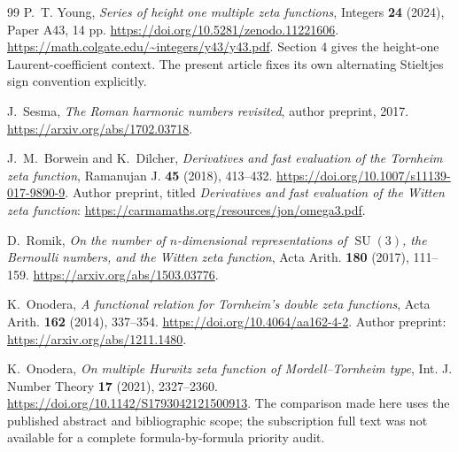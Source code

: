 \begin{thebibliography}{99}
P.~T. Young,
\emph{Series of height one multiple zeta functions},
Integers \textbf{24} (2024), Paper A43, 14 pp.
\url{https://doi.org/10.5281/zenodo.11221606}.
\url{https://math.colgate.edu/~integers/y43/y43.pdf}.
Section 4 gives the height-one Laurent-coefficient context. The present
article fixes its own alternating Stieltjes sign convention explicitly.

J.~Sesma,
\emph{The Roman harmonic numbers revisited}, author preprint, 2017.
\url{https://arxiv.org/abs/1702.03718}.

J.~M.~Borwein and K.~Dilcher,
\emph{Derivatives and fast evaluation of the Tornheim zeta function},
Ramanujan J. \textbf{45} (2018), 413--432.
\url{https://doi.org/10.1007/s11139-017-9890-9}.
Author preprint, titled \emph{Derivatives and fast evaluation of the
Witten zeta function}:
\url{https://carmamaths.org/resources/jon/omega3.pdf}.

D.~Romik,
\emph{On the number of $n$-dimensional representations of
$\operatorname{SU}(3)$, the Bernoulli numbers, and the Witten zeta
function}, Acta Arith. \textbf{180} (2017), 111--159.
\url{https://arxiv.org/abs/1503.03776}.

K.~Onodera,
\emph{A functional relation for Tornheim's double zeta functions},
Acta Arith. \textbf{162} (2014), 337--354.
\url{https://doi.org/10.4064/aa162-4-2}.
Author preprint: \url{https://arxiv.org/abs/1211.1480}.

K.~Onodera,
\emph{On multiple Hurwitz zeta function of Mordell--Tornheim type},
Int. J. Number Theory \textbf{17} (2021), 2327--2360.
\url{https://doi.org/10.1142/S1793042121500913}.
The comparison made here uses the published abstract and bibliographic
scope; the subscription full text was not available for a complete
formula-by-formula priority audit.

\end{thebibliography}
